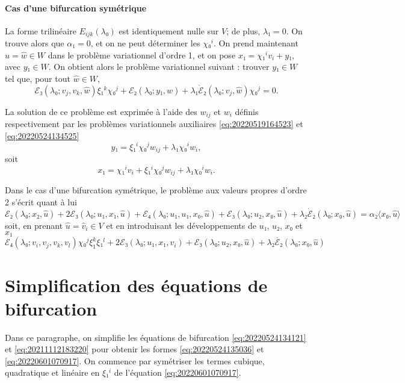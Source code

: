 \documentclass[12pt, final]{scrartcl}
\theoremstyle{definition}
\begin{document}
\paragraph{Cas d'une bifurcation symétrique} La forme trilinéaire
\(E_{i j k}(λ₀)\) est identiquement nulle sur \(V\); de plus, \(λ₁ = 0\). On
trouve alors que \(α₁ = 0\), et on ne peut déterminer les \(χ₀^i\). On prend
maintenant \(\hat{u} = \hat{w}∈W\) dans le problème variationnel d'ordre 1, et
on pose \(x₁ = χ₁^i v_i + y₁\), avec \(y₁∈W\). On obtient alors le problème
variationnel suivant : trouver \(y₁∈W\) tel que, pour tout \(\hat{w}∈W\),
\begin{equation}
  ℰ₃(λ₀; v_j, v_k, \hat{w}) ξ₁^k χ₀^j + ℰ₂(λ₀; y₁, \hat{w}) + λ₁ \dot{ℰ}₂(λ₀; v_j, \hat{w}) χ₀^j = 0.
\end{equation}

La solution de ce problème est exprimée à l'aide des \(w_{i j}\) et \(w_i\)
définis respectivement par les problèmes variationnels auxiliaires
\eqref{eq:20220519164523} et \eqref{eq:20220524134525}
\begin{equation}
  y₁ = ξ₁^i χ₀^j w_{i j} + λ₁ χ₀^i w_i,
\end{equation}
soit
\begin{equation}
  x₁ = χ₁^i v_i + ξ₁^i χ₀^j w_{i j} + λ₁ χ₀^i w_i.
\end{equation}

Dans le cas d'une bifurcation symétrique, le problème aux valeurs propres d'ordre 2 s'écrit quant à lui
\begin{equation}
  ℰ₂(λ₀; x₂, \hat{u}) + 2ℰ₃(λ₀; u₁, x₁, \hat{u}) +ℰ₄ (λ₀; u₁, u₁, x₀, \hat{u}) + ℰ₃(λ₀; u₂, x₀, \hat{u}) + λ₂ \dot{ℰ}₂(λ₀; x₀, \hat{u}) = α₂ 〈 x₀, \hat{u} 〉
\end{equation}
soit, en prenant \(\hat{u} = \hat{v}_i∈V\) et en introduisant les développements
de \(u₁\), \(u₂\), \(x₀ \) et \(x₁\)
\begin{equation}
  ℰ₄ (λ₀; v_i, v_j, v_k, v_l) χ₀^j ξ_{1}^k ξ₁^l + 2ℰ₃(λ₀; u₁, x₁, v_i) +ℰ₃(λ₀ ; u₂, x₀, \hat{u}) + λ₂ \dot{ℰ₂}(λ₀; x₀, \hat{u})
\end{equation}

\section{Simplification des équations de bifurcation}
\label{sec:20220524134954}

Dans ce paragraphe, on simplifie les équations de bifurcation
\eqref{eq:20220524134121} et \eqref{eq:20211112183220} pour obtenir les formes
\eqref{eq:20220524135036} et \eqref{eq:20220601070917}. On commence par
symétriser les termes cubique, quadratique et linéaire en \(ξ₁^i\) de l'équation
\eqref{eq:20220601070917}.
\end{document}
